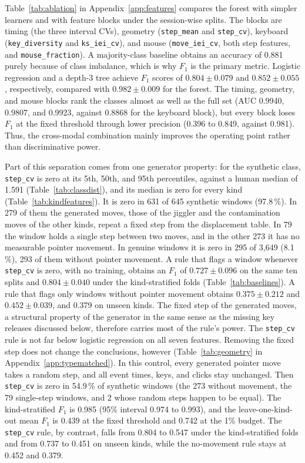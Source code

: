 \documentclass[sensors,article,submit,pdftex,oneauthor]{Definitions/mdpi}
\begin{document}
Table~\ref{tab:ablation} in Appendix~\ref{app:features} compares the forest with simpler learners and with feature blocks under the session-wise splits. The blocks are timing (the three interval CVs), geometry (\texttt{step\_mean} and \texttt{step\_cv}), keyboard (\texttt{key\_diversity} and \texttt{ks\_iei\_cv}), and mouse (\texttt{move\_iei\_cv}, both step features, and \texttt{mouse\_fraction}). A majority-class baseline obtains an accuracy of 0.881 purely because of class imbalance, which is why $F_1$ is the primary metric. Logistic regression and a depth-3 tree achieve $F_1$ scores of $0.804 \pm 0.079$ and $0.852 \pm 0.055$, respectively, compared with $0.982 \pm 0.009$ for the forest. The timing, geometry, and mouse blocks rank the classes almost as well as the full set (AUC 0.9940, 0.9807, and 0.9923, against 0.8868 for the keyboard block), but every block loses $F_1$ at the fixed threshold through lower precision (0.396 to 0.849, against 0.981). Thus, the cross-modal combination mainly improves the operating point rather than discriminative power.


Part of this separation comes from one generator property: for the synthetic class, \texttt{step\_cv} is zero at its 5th, 50th, and 95th percentiles, against a human median of 1.591 (Table~\ref{tab:classdist}), and its median is zero for every kind (Table~\ref{tab:kindfeatures}). It is zero in 631 of 645 synthetic windows (97.8\,\%). In 279 of them the generated moves, those of the jiggler and the contamination moves of the other kinds, repeat a fixed step from the displacement table. In 79 the window holds a single step between two moves, and in the other 273 it has no measurable pointer movement. In genuine windows it is zero in 295 of 3,649 (8.1\,\%), 293 of them without pointer movement. A rule that flags a window whenever \texttt{step\_cv} is zero, with no training, obtains an $F_1$ of $0.727 \pm 0.096$ on the same ten splits and $0.804 \pm 0.040$ under the kind-stratified folds (Table~\ref{tab:baselines}). A rule that flags only windows without pointer movement obtains $0.375 \pm 0.212$ and $0.452 \pm 0.039$, and 0.379 on unseen kinds. The fixed step of the generated moves, a structural property of the generator in the same sense as the missing key releases discussed below, therefore carries most of the rule's power. The \texttt{step\_cv} rule is not far below logistic regression on all seven features. Removing the fixed step does not change the conclusions, however (Table~\ref{tab:geometry} in Appendix~\ref{app:typematched}). In this control, every generated pointer move takes a random step, and all event times, keys, and clicks stay unchanged. Then \texttt{step\_cv} is zero in 54.9\,\% of synthetic windows (the 273 without movement, the 79 single-step windows, and 2 whose random steps happen to be equal). The kind-stratified $F_1$ is 0.985 (95\% interval 0.974 to 0.993), and the leave-one-kind-out mean $F_1$ is 0.439 at the fixed threshold and 0.742 at the 1\% budget. The \texttt{step\_cv} rule, by contrast, falls from 0.804 to 0.547 under the kind-stratified folds and from 0.737 to 0.451 on unseen kinds, while the no-movement rule stays at 0.452 and 0.379.
\end{document}
